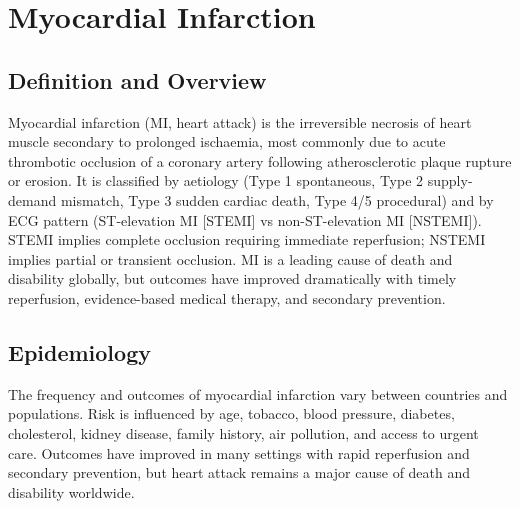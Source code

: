 \chapter{Myocardial Infarction}

\section*{Definition and Overview}
Myocardial infarction (MI, heart attack) is the irreversible necrosis of heart muscle secondary to prolonged ischaemia, most commonly due to acute thrombotic occlusion of a coronary artery following atherosclerotic plaque rupture or erosion. It is classified by aetiology (Type 1 spontaneous, Type 2 supply-demand mismatch, Type 3 sudden cardiac death, Type 4/5 procedural) and by ECG pattern (ST-elevation MI [STEMI] vs non-ST-elevation MI [NSTEMI]). STEMI implies complete occlusion requiring immediate reperfusion; NSTEMI implies partial or transient occlusion. MI is a leading cause of death and disability globally, but outcomes have improved dramatically with timely reperfusion, evidence-based medical therapy, and secondary prevention.

\section*{Epidemiology}
The frequency and outcomes of myocardial infarction vary between countries and populations. Risk is influenced by age, tobacco, blood pressure, diabetes, cholesterol, kidney disease, family history, air pollution, and access to urgent care. Outcomes have improved in many settings with rapid reperfusion and secondary prevention, but heart attack remains a major cause of death and disability worldwide.

